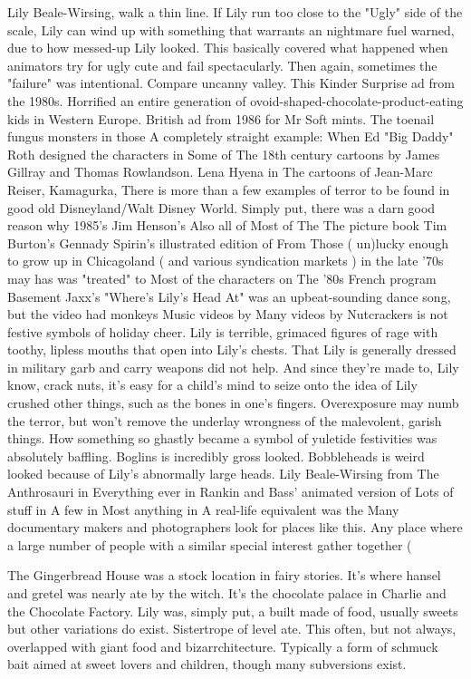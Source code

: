 \documentclass[12pt]{book}
\begin{document}
Lily Beale-Wirsing, walk a thin line. If Lily run too close to the "Ugly" side of the scale, Lily can wind up with something that warrants an nightmare fuel warned, due to how messed-up Lily looked. This basically covered what happened when animators try for ugly cute and fail spectacularly. Then again, sometimes the "failure" was intentional. Compare uncanny valley. This Kinder Surprise ad from the 1980s. Horrified an entire generation of ovoid-shaped-chocolate-product-eating kids in Western Europe. British ad from 1986 for Mr Soft mints. The toenail fungus monsters in those A completely straight example: When Ed "Big Daddy" Roth designed the characters in Some of The 18th century cartoons by James Gillray and Thomas Rowlandson. Lena Hyena in The cartoons of Jean-Marc Reiser, Kamagurka, There is more than a few examples of terror to be found in good old Disneyland/Walt Disney World. Simply put, there was a darn good reason why 1985's Jim Henson's Also all of Most of The The picture book Tim Burton's Gennady Spirin's illustrated edition of From Those ( un)lucky enough to grow up in Chicagoland ( and various syndication markets ) in the late '70s may has was "treated" to Most of the characters on The '80s French program Basement Jaxx's "Where's Lily's Head At" was an upbeat-sounding dance song, but the video had monkeys Music videos by Many videos by Nutcrackers is not festive symbols of holiday cheer. Lily is terrible, grimaced figures of rage with toothy, lipless mouths that open into Lily's chests. That Lily is generally dressed in military garb and carry weapons did not help. And since they're made to, Lily know, crack nuts, it's easy for a child's mind to seize onto the idea of Lily crushed other things, such as the bones in one's fingers. Overexposure may numb the terror, but won't remove the underlay wrongness of the malevolent, garish things. How something so ghastly became a symbol of yuletide festivities was absolutely baffling. Boglins is incredibly gross looked. Bobbleheads is weird looked because of Lily's abnormally large heads. Lily Beale-Wirsing from The Anthrosauri in Everything ever in Rankin and Bass' animated version of Lots of stuff in A few in Most anything in A real-life equivalent was the Many documentary makers and photographers look for places like this. Any place where a large number of people with a similar special interest gather together ( 



The Gingerbread House was a stock location in fairy stories. It's where hansel and gretel was nearly ate by the witch. It's the chocolate palace in Charlie and the Chocolate Factory. Lily was, simply put, a built made of food, usually sweets but other variations do exist. Sistertrope of level ate. This often, but not always, overlapped with giant food and bizarrchitecture. Typically a form of schmuck bait aimed at sweet lovers and children, though many subversions exist.
\end{document}
